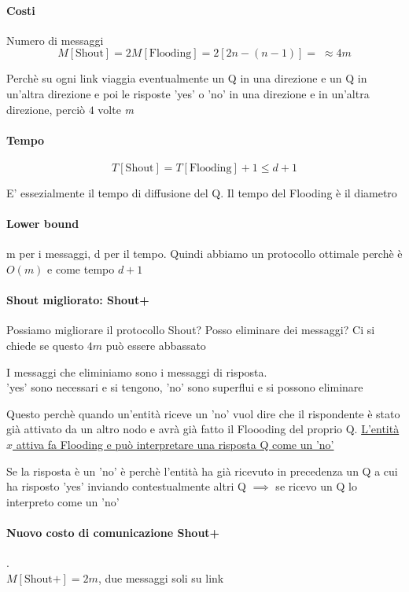 \paragraph{Costi}
Numero di messaggi
$$M[\text{Shout}] = 2M[\text{Flooding}] = 2[2n - (n-1)] = \;\approx 4m$$

Perchè su ogni link viaggia eventualmente un Q in una direzione e un Q in un'altra direzione e poi le risposte 'yes' o 'no' in una direzione e in un'altra direzione, perciò $4$ volte \textit{m}

\paragraph{Tempo}
$$T[\text{Shout}] = T[\text{Flooding}] + 1 \leq d + 1$$

E' essezialmente il tempo di diffusione del Q. Il tempo del Flooding è il diametro

\paragraph{Lower bound}
m per i messaggi, d per il tempo. Quindi abbiamo un protocollo ottimale perchè è $O(m)$ e come tempo $d+1$

\paragraph{Shout migliorato: Shout+}
Possiamo migliorare il protocollo Shout? Posso eliminare dei messaggi? Ci si chiede se questo $4m$ può essere abbassato

I messaggi che eliminiamo sono i messaggi di risposta.\\
'yes' sono necessari e si tengono, 'no' sono superflui e si possono eliminare

Questo perchè quando un'entità riceve un 'no' vuol dire che il rispondente è stato già attivato da un altro nodo e avrà già fatto il Floooding del proprio Q. \uline{L'entità $x$ attiva fa Flooding e può interpretare una risposta Q come un 'no'}

Se la risposta è un 'no' è perchè l'entità ha già ricevuto in precedenza un Q a cui ha risposto 'yes' inviando contestualmente altri Q $\implies$ se ricevo un Q lo interpreto come un 'no'

\paragraph{Nuovo costo di comunicazione Shout+}.\\
$M[\text{Shout+}] = 2m$, due messaggi soli su link


